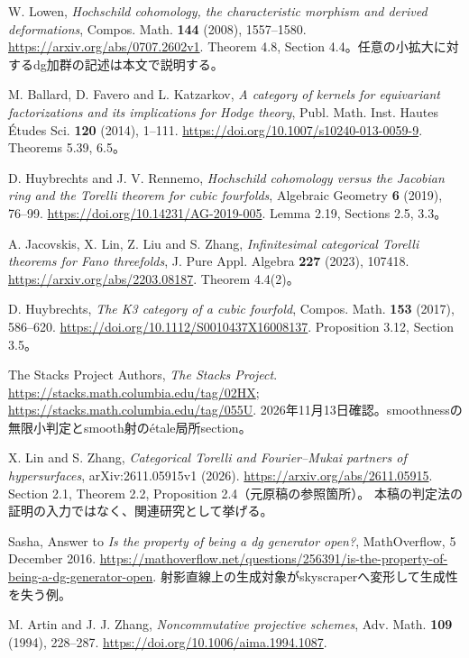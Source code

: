  W. Lowen,
\emph{Hochschild cohomology, the characteristic morphism and derived deformations},
Compos. Math. \textbf{144} (2008), 1557--1580.
\url{https://arxiv.org/abs/0707.2602v1}.
Theorem 4.8, Section 4.4。任意の小拡大に対するdg加群の記述は本文で説明する。

 M. Ballard, D. Favero and L. Katzarkov,
\emph{A category of kernels for equivariant factorizations and its implications for Hodge theory},
Publ. Math. Inst. Hautes Études Sci. \textbf{120} (2014), 1--111.
\url{https://doi.org/10.1007/s10240-013-0059-9}.
Theorems 5.39, 6.5。

 D. Huybrechts and J. V. Rennemo,
\emph{Hochschild cohomology versus the Jacobian ring and the Torelli theorem for cubic fourfolds},
Algebraic Geometry \textbf{6} (2019), 76--99.
\url{https://doi.org/10.14231/AG-2019-005}.
Lemma 2.19, Sections 2.5, 3.3。

 A. Jacovskis, X. Lin, Z. Liu and S. Zhang,
\emph{Infinitesimal categorical Torelli theorems for Fano threefolds},
J. Pure Appl. Algebra \textbf{227} (2023), 107418.
\url{https://arxiv.org/abs/2203.08187}.
Theorem 4.4(2)。

 D. Huybrechts,
\emph{The K3 category of a cubic fourfold},
Compos. Math. \textbf{153} (2017), 586--620.
\url{https://doi.org/10.1112/S0010437X16008137}.
Proposition 3.12, Section 3.5。

 The Stacks Project Authors, \emph{The Stacks Project}.
\url{https://stacks.math.columbia.edu/tag/02HX};
\url{https://stacks.math.columbia.edu/tag/055U}.
2026年11月13日確認。smoothnessの無限小判定とsmooth射のétale局所section。

 X. Lin and S. Zhang,
\emph{Categorical Torelli and Fourier--Mukai partners of hypersurfaces},
arXiv:2611.05915v1 (2026).
\url{https://arxiv.org/abs/2611.05915}.
Section 2.1, Theorem 2.2, Proposition 2.4（元原稿の参照箇所）。
本稿の判定法の証明の入力ではなく、関連研究として挙げる。

 Sasha,
Answer to \emph{Is the property of being a dg generator open?},
MathOverflow, 5 December 2016.
\url{https://mathoverflow.net/questions/256391/is-the-property-of-being-a-dg-generator-open}.
射影直線上の生成対象がskyscraperへ変形して生成性を失う例。

M. Artin and J. J. Zhang, \emph{Noncommutative projective schemes},
Adv. Math. \textbf{109} (1994), 228--287.
\url{https://doi.org/10.1006/aima.1994.1087}.

